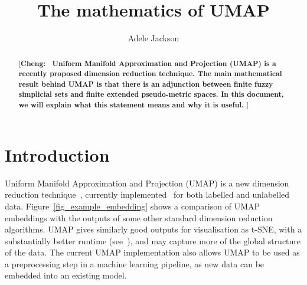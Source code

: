 \documentclass[a4paper,11pt,leqno]{article} \usepackage{amsmath}
\title{The mathematics of UMAP} \author{Adele Jackson}
\theoremstyle{definition}
\newcommand{\cheng}[1]{ {\color{purple}[{\bf Cheng:~{#1}}]} }
\begin{document}
\thispagestyle{empty}
\maketitle

\begin{abstract}
\cheng{
Uniform Manifold Approximation and Projection (UMAP) is a recently proposed dimension
reduction technique.
The main mathematical result behind UMAP is that there is an adjunction between
finite fuzzy simplicial sets and finite extended pseudo-metric spaces.
In this document, we will explain what this statement means and why it is
useful.
}
\end{abstract}

\section{Introduction}

Uniform Manifold Approximation and Projection (UMAP) is a new dimension
reduction technique~\cite{McInnes18}, currently
implemented~\cite{McInnesGithub, MelvilleGithub} for both labelled and
unlabelled data.
Figure~\ref{fig_example_embedding} shows a comparison of UMAP embeddings with
the outputs of some other standard dimension reduction algorithms.
UMAP gives similarly good outputs for visualisation as t-SNE, with
a substantially better runtime (see~\cite{McInnesBenchmarking}), and may
capture more of the global structure of the data.
The current UMAP implementation also allows UMAP to be used as a preprocessing
step in a machine learning pipeline, as new data can be embedded into an
existing model.
\end{document}
